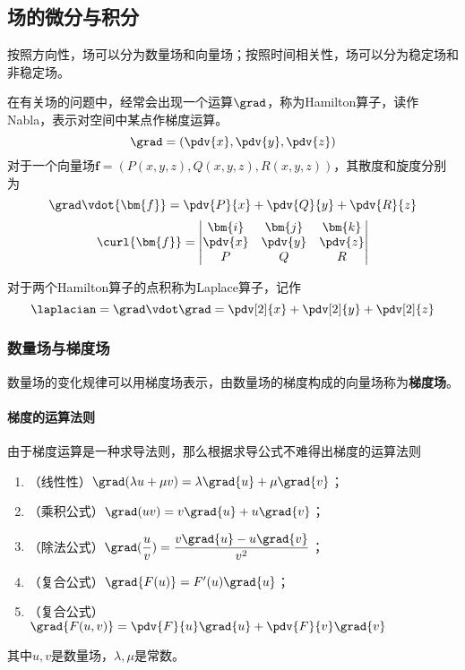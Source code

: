 \subsection{场的微分与积分}
按照方向性，场可以分为数量场和向量场；按照时间相关性，场可以分为稳定场和非稳定场。

在有关场的问题中，经常会出现一个运算$\grad$，称为Hamilton算子，读作Nabla，表示对空间中某点作梯度运算。
\[ \grad = \left(\pdv{x},\pdv{y},\pdv{z}\right) \]
对于一个向量场$\bm{f}=(P(x,y,z),Q(x,y,z),R(x,y,z))$，其散度和旋度分别为
\[ \grad\vdot{\bm{f}} = \pdv{P}{x} + \pdv{Q}{y} + \pdv{R}{z} \]
\[
    \curl{\bm{f}} =
    \begin{vmatrix}
        \bm{i}  & \bm{j}  & \bm{k}  \\
        \pdv{x} & \pdv{y} & \pdv{z} \\
        P       & Q       & R
    \end{vmatrix}
\]

对于两个Hamilton算子的点积称为Laplace算子，记作
\[ \laplacian = \grad \vdot \grad = \pdv[2]{x} + \pdv[2]{y} + \pdv[2]{z} \]

\subsubsection{数量场与梯度场}
数量场的变化规律可以用梯度场表示，由数量场的梯度构成的向量场称为\textbf{\textsf{梯度场}}。

\paragraph{梯度的运算法则}
由于梯度运算是一种求导法则，那么根据求导公式不难得出梯度的运算法则
\begin{enumerate}[(1)]
    \item （线性性）$\grad(\lambda u + \mu v) = \lambda\grad{u} + \mu\grad{v}$；
    \item （乘积公式）$\grad(uv) = v\grad{u} + u\grad{v}$；
    \item （除法公式）$\grad(\dfrac{u}{v}) = \dfrac{v\grad{u}-u\grad{v}}{v^2}$；
    \item （复合公式）$\grad{F(u)} = F'(u)\grad{u}$；
    \item （复合公式）$\grad{F(u,v)} = \pdv{F}{u}\grad{u} + \pdv{F}{v}\grad{v}$
\end{enumerate}
其中$u,v$是数量场，$\lambda,\mu$是常数。

